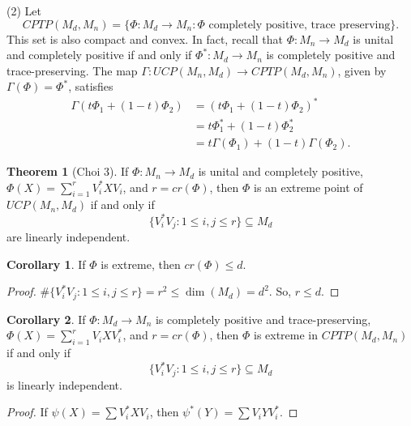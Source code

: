 \documentclass[12pt]{article}
\theoremstyle{definition}
\newtheorem*{theorem}{Theorem}
\newtheorem*{corollary}{Corollary}
\begin{document}
(2) Let
\[
CPTP(M_d,M_n)=\{\Phi : M_d \to M_n : \Phi \text{ completely positive, trace preserving}\}.
\]
This set is also compact and convex. In fact, recall that $\Phi : M_n \to M_d$ is unital and completely positive if and only if $\Phi^* : M_d \to M_n$ is completely positive and trace-preserving. The map $\Gamma:UCP(M_n,M_d) \to CPTP(M_d,M_n)$, given by $\Gamma(\Phi)=\Phi^*$, satisfies
\begin{align*}
\Gamma(t\Phi_1 + (1-t)\Phi_2) &= (t\Phi_1 + (1-t)\Phi_2)^* \\
&= t\Phi_1^* + (1-t)\Phi_2^* \\
&= t\Gamma(\Phi_1) + (1-t)\Gamma(\Phi_2).
\end{align*}

\begin{theorem}[Choi 3]
If $\Phi : M_n \to M_d$ is unital and completely positive, $\Phi(X)=\sum_{i=1}^r V_i^*XV_i$, and $r=cr(\Phi)$, then $\Phi$ is an extreme point of $UCP(M_n,M_d)$ if and only if
\[
\{V_i^*V_j : 1 \leq i,j \leq r\} \subseteq M_d
\]
are linearly independent.
\end{theorem}

\begin{corollary}
If $\Phi$ is extreme, then $cr(\Phi) \leq d$.
\end{corollary}

\begin{proof}
$\#\{V_i^*V_j : 1 \leq i,j \leq r\}=r^2 \leq \dim(M_d)=d^2$. So, $r \leq d$.
\end{proof}

\begin{corollary}
If $\Phi : M_d \to M_n$ is completely positive and trace-preserving, $\Phi(X)=\sum_{i=1}^r V_iXV_i^*$, and $r=cr(\Phi)$, then $\Phi$ is extreme in $CPTP(M_d,M_n)$ if and only if
\[
\{V_i^*V_j : 1 \leq i,j \leq r\} \subseteq M_d
\]
is linearly independent.
\end{corollary}

\begin{proof}
If $\psi(X)=\sum V_i^*XV_i$, then $\psi^*(Y)=\sum V_iYV_i^*$.
\end{proof}
\end{document}
